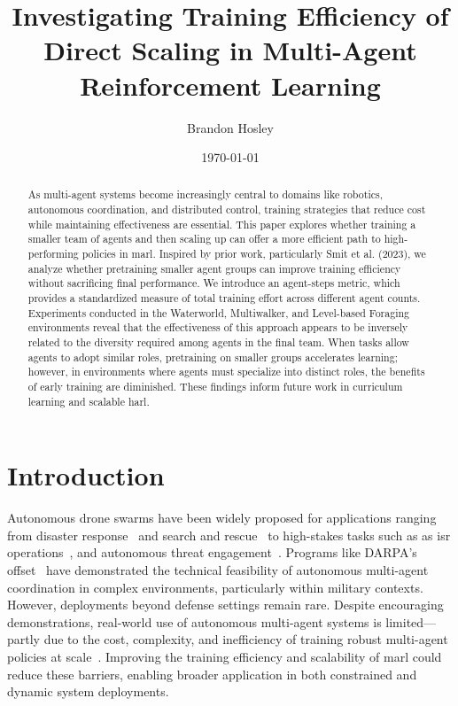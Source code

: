 \documentclass{article}
\title{Investigating Training Efficiency of Direct Scaling in Multi-Agent Reinforcement Learning}
\author{Brandon Hosley}
\date{\today}
\begin{document}
\maketitle

\begin{abstract}
    As multi-agent systems become increasingly central to domains like robotics, 
    autonomous coordination, and distributed control, training strategies 
    that reduce cost while maintaining effectiveness are essential. 
    This paper explores whether training a smaller team of agents and then scaling 
    up can offer a more efficient path to high-performing policies in \gls{marl}.
    Inspired by prior work, particularly Smit et al. (2023), 
    we analyze whether pretraining smaller agent groups can improve training efficiency 
    without sacrificing final performance. 
    We introduce an agent-steps metric, which provides a standardized measure of 
    total training effort across different agent counts.
    Experiments conducted in the Waterworld, Multiwalker, and Level-based Foraging environments 
    reveal that the effectiveness of this approach appears to be inversely related 
    to the diversity required among agents in the final team. 
    When tasks allow agents to adopt similar roles, 
    pretraining on smaller groups accelerates learning; 
    however, in environments where agents must specialize into distinct roles, 
    the benefits of early training are diminished. 
    These findings inform future work in curriculum learning and scalable \gls{harl}.
    \glsresetall
\end{abstract}


\section{Introduction}

Autonomous drone swarms have been widely proposed for applications ranging from 
disaster response~\cite{mohddaud2022} and search and rescue~\cite{mohddaud2022} 
to high-stakes tasks such as as \gls{isr} operations~\cite{hambling2021}, 
and autonomous threat engagement~\cite{rogers2022, kallenborn2024}. 
Programs like DARPA's \gls{offset}~\cite{zotero-2835} 
have demonstrated the technical feasibility of autonomous multi-agent coordination 
in complex environments, particularly within military contexts. However, 
deployments beyond defense settings remain rare. Despite encouraging demonstrations, 
real-world use of autonomous multi-agent systems is limited—partly due to the cost, 
complexity, and inefficiency of training robust multi-agent policies at scale~\cite{jin2025}. 
Improving the training efficiency and scalability of \gls{marl} 
could reduce these barriers, enabling broader application in both 
constrained and dynamic system deployments.
\end{document}
